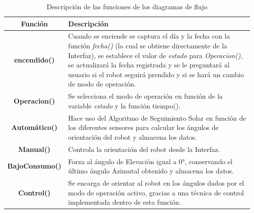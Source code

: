 \begin{table}[H]
  \centering
  \caption{Descripción de las funciones de los diagramas de flujo}
    \begin{tabular}{@{}|c|p{10cm}|}
    \hline
    \textbf{Función} & \textbf{Descripción} \\
    \hline \hline
    \textbf{encendido()} & Cuando se enciende se captura el día y la fecha con la función \textit{fecha()} (la cual se obtiene directamente de la Interfaz), se establece el valor de \textit{estado} para \textit{Operacion()}, se actualizará la fecha registrada y se le preguntará al usuario si el robot seguirá prendido y si se hará un cambio de modo de operación. \\
    \hline
    \textbf{Operacion()} & Se selecciona el modo de operación en función de la variable \textit{estado} y la función tiempo(). \\
    \hline
    \textbf{Automático()} & Hace uso del Algoritmo de Seguimiento Solar en función de los diferentes sensores para calcular los ángulos de orientación del robot y almacena los datos. \\ 
    \hline
    \textbf{Manual()} & Controla la orientación del robot desde la Interfaz. \\
    \hline
    \textbf{BajoConsumo()} & Forza al ángulo de Elevación igual a 0°, conservando el último ángulo Azimutal obtenido y almacena los datos. \\
    \hline
    \textbf{Control()} & Se encarga de orientar al robot en los ángulos dados por el modo de operación activo, gracias a una técnica de control implementada dentro de esta función. \\
    \hline
    \end{tabular}%
  \label{tab:dia_flu}%
\end{table}%





